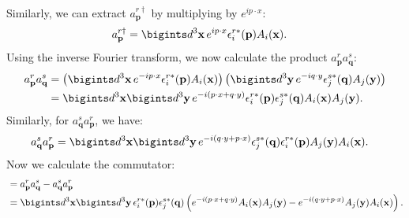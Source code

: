 \begin{enumerate}
Similarly, we can extract $a^{r\dagger}_{\mathbf{p}}$ by multiplying by $e^{i p \cdot x}$:
\begin{align}
    a^{r\dagger}_{\mathbf{p}} &= \bigints d^3 \mathbf{x} \, e^{i p \cdot x} \epsilon_i^{r*}(\mathbf{p}) A_i(\mathbf{x}).
\end{align}
Using the inverse Fourier transform, we now calculate the product $a^r_{\mathbf{p}} a^s_{\mathbf{q}}$:
\begin{align*}
    a^r_{\mathbf{p}} a^s_{\mathbf{q}} &= \left( \bigints d^3 \mathbf{x} \, e^{-i p \cdot x} \epsilon_i^{r*}(\mathbf{p}) A_i(\mathbf{x}) \right) \left( \bigints d^3 \mathbf{y} \, e^{-i q \cdot y} \epsilon_j^{s*}(\mathbf{q}) A_j(\mathbf{y}) \right) \nonumber \\
    &= \bigints d^3 \mathbf{x} \bigints d^3 \mathbf{y} \, e^{-i (p \cdot x + q \cdot y)} \epsilon_i^{r*}(\mathbf{p}) \epsilon_j^{s*}(\mathbf{q}) A_i(\mathbf{x}) A_j(\mathbf{y}).
\end{align*}
Similarly, for $a^s_{\mathbf{q}} a^r_{\mathbf{p}}$, we have:
\begin{align*}
    a^s_{\mathbf{q}} a^r_{\mathbf{p}} &= \bigints d^3 \mathbf{x} \bigints d^3 \mathbf{y} \, e^{-i (q \cdot y + p \cdot x)} \epsilon_j^{s*}(\mathbf{q}) \epsilon_i^{r*}(\mathbf{p}) A_j(\mathbf{y}) A_i(\mathbf{x}).
\end{align*}
Now we calculate the commutator:
\begin{align}
    [a^r_{\mathbf{p}}, a^s_{\mathbf{q}}] &= a^r_{\mathbf{p}} a^s_{\mathbf{q}} - a^s_{\mathbf{q}} a^r_{\mathbf{p}} \nonumber \\
    &= \bigints d^3 \mathbf{x} \bigints d^3 \mathbf{y} \, \epsilon_i^{r*}(\mathbf{p}) \epsilon_j^{s*}(\mathbf{q}) \left( e^{-i (p \cdot x + q \cdot y)} A_i(\mathbf{x}) A_j(\mathbf{y}) - e^{-i (q \cdot y + p \cdot x)} A_j(\mathbf{y}) A_i(\mathbf{x}) \right). 
\end{align}


\end{enumerate}
